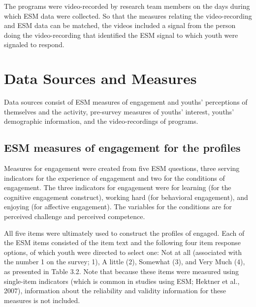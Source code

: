 \documentclass[]{book}
\theoremstyle{definition}
\theoremstyle{definition}
\theoremstyle{definition}
\theoremstyle{remark}
\begin{document}
The programs were video-recorded by research team members on the days
during which ESM data were collected. So that the measures relating the
video-recording and ESM data can be matched, the videos included a
signal from the person doing the video-recording that identified the ESM
signal to which youth were signaled to respond.

\section{Data Sources and Measures}\label{data-sources-and-measures}

Data sources consist of ESM measures of engagement and youths'
perceptions of themselves and the activity, pre-survey measures of
youths' interest, youths' demographic information, and the
video-recordings of programs.

\subsection{ESM measures of engagement for the
profiles}\label{esm-measures-of-engagement-for-the-profiles}

Measures for engagement were created from five ESM questions, three
serving indicators for the experience of engagement and two for the
conditions of engagement. The three indicators for engagement were for
learning (for the cognitive engagement construct), working hard (for
behavioral engagement), and enjoying (for affective engagement). The
variables for the conditions are for perceived challenge and perceived
competence.

All five items were ultimately used to construct the profiles of
engaged. Each of the ESM items consisted of the item text and the
following four item response options, of which youth were directed to
select one: Not at all (associated with the number 1 on the survey; 1),
A little (2), Somewhat (3), and Very Much (4), as presented in Table
3.2. Note that because these items were measured using single-item
indicators (which is common in studies using ESM; Hektner et al., 2007),
information about the reliability and validity information for these
measures is not included.
\end{document}
